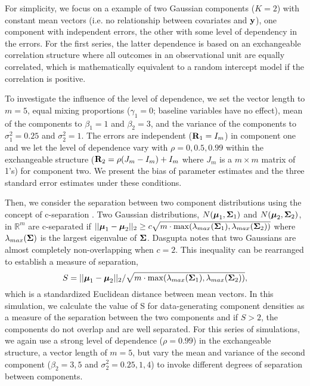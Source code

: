  For simplicity, we focus on a example of two Gaussian components ($K = 2$) with constant mean vectors (i.e. no relationship between covariates and $\mathbf y$), one component with independent errors, the other with some level of dependency in the errors. For the first series, the latter dependence is based on an exchangeable correlation structure where all outcomes in an observational unit are equally correlated, which is mathematically equivalent to a random intercept model if the correlation is positive.
 
To investigate the influence of the level of dependence, we set the vector length to $m=5$, equal mixing proportions ($\gamma_{1}=0$; baseline variables have no effect), mean of the components to $\beta_{1}=1$ and $\beta_{2}=3$, and the variance of the components to $\sigma^{2}_{1}=0.25$ and $\sigma^{2}_{2}=1$. The errors are independent ($\mathbf R_{1}=I_{m}$) in component one and we let the level of dependence vary with $\rho=0,0.5,0.99$ within the exchangeable structure ($\mathbf R_2 = \rho(J_m-I_m)+I_m$ where $J_m$ is a $m\times m$ matrix of 1's) for component two. We present the bias of parameter estimates and the three standard error estimates under these conditions.

Then, we consider the separation between two component distributions using the concept of c-separation \cite{dasgupta1999}. Two Gaussian distributions, $N(\boldsymbol\mu_{1},\boldsymbol\Sigma_{1})$ and $N(\boldsymbol\mu_{2},\boldsymbol\Sigma_{2})$, in $\mathbb{R}^{m}$ are c-separated if $||\boldsymbol\mu_{1}-\boldsymbol\mu_{2}||_{2}\geq c\sqrt{m\cdot\max(\lambda_{max}(\boldsymbol\Sigma_{1}),\lambda_{max}(\boldsymbol\Sigma_{2}))}$
where $\lambda_{max}(\boldsymbol\Sigma)$ is the largest eigenvalue of $\boldsymbol\Sigma$.  Dasgupta \cite{dasgupta1999} notes that two Gaussians are almost completely non-overlapping when $c=2$. This inequality can be rearranged to establish a measure of separation,
$$S = ||\boldsymbol\mu_{1}-\boldsymbol\mu_{2}||_{2}/\sqrt{m\cdot\max(\lambda_{max}(\boldsymbol\Sigma_{1}),\lambda_{max}(\boldsymbol\Sigma_{2}))},$$
which is a standardized Euclidean distance between mean vectors. In this simulation, we calculate the value of S for data-generating component densities as a measure of the separation between the two components and if $S>2$, the components do not overlap and are well separated. For this series of simulations, we again use a strong level of dependence ($\rho=0.99$) in the exchangeable structure, a vector length of $m=5$, but vary the mean and variance of the second component ($\beta_{2}=3,5$ and $\sigma_{2}^{2}=0.25,1,4$) to invoke different degrees of separation between components.

